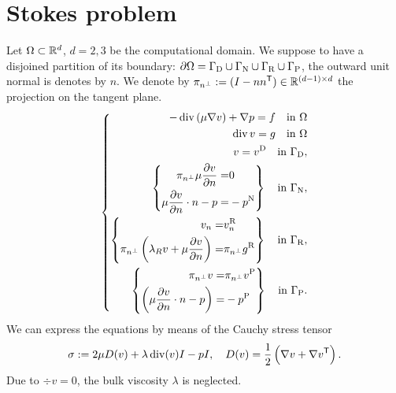%
\section{Stokes problem}\label{sec:}
%
Let $\Omega\subset \mathbb R^d$, $d=2,3$ be the computational domain. We suppose to have a disjoined partition of its boundary:
$\partial\Omega=\Gamma_{\rm D}\cup\Gamma_{\rm N}\cup\Gamma_{\rm R}\cup\Gamma_{\rm P}$, the outward unit normal is denotes by $n$. We denote by 
$\pi_{n^{\perp}} := (I-n{n}^{\mathsf{T}})\in \mathbb R^{(d-1)\times d}$ the projection on the tangent plane.
%
\begin{equation}\label{eq:stokes:strongform}
%
\left\{
\begin{aligned}
-\div\left(\mu\nabla v\right) + \nabla p = f \quad \mbox{in $\Omega$}\\
\div v  = g \quad \mbox{in $\Omega$}\\
v = \vD \quad \mbox{in $\GammaD$},\\
%
\left\{
\begin{aligned}
\pitang \mu \frac{\partial v}{\partial n}  =& 0\\
 \mu \frac{\partial v}{\partial n}\cdot n -p   =& -\pN
\end{aligned}
\right\}\quad \mbox{in $\GammaN$},\\
%
%
\left\{
\begin{aligned}
v_n =& \vRn\\
\pitang \left( \lambda_R v + \mu \frac{\partial v}{\partial n}\right)  =& \pitang\gR 
\end{aligned}
\right\}
%
\quad \mbox{in $\GammaR$},\\
%
\left\{
\begin{aligned}
\pitang v =& \pitang \vP\\
\left(  \mu \frac{\partial v}{\partial n}\cdot n -p \right)  =& -\pP
\end{aligned}
\right\}
%
\quad \mbox{in $\GammaP$}.
\end{aligned}
\right.
%
\end{equation}
%
We can express the equations by means of the Cauchy stress tensor
%
\begin{equation}\label{eq:Stokes:CauchyStress}
\sigma := 2\mu D(v) + \lambda\operatorname{div}(v) I - p I,\quad  D(v)  = \frac12 \left(\nabla v + {\nabla v}^{\mathsf{T}}\right).
\end{equation}
%
Due to $\div v=0$, the bulk viscosity $\lambda$ is neglected.

